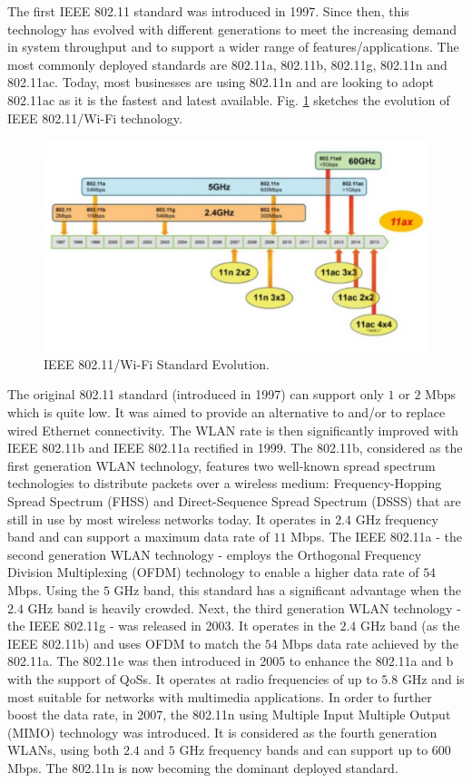 The first IEEE 802.11 standard was introduced in 1997. Since then, this technology has evolved with different generations to meet the increasing demand in system throughput and to support a wider range of features/applications. The most commonly deployed standards are 802.11a, 802.11b, 802.11g, 802.11n and 802.11ac. Today, most businesses are using 802.11n and are looking to adopt 802.11ac as it is the fastest and latest available. Fig. \ref{figs:Wi-Fi-evolution} sketches the evolution of IEEE 802.11/Wi-Fi technology.

\begin{figure}[!t]
	\centering
	\includegraphics[width=1.0\columnwidth]{figs/Wi-Fi-evolution.pdf}
	\caption{IEEE 802.11/Wi-Fi Standard Evolution.}
	\label{figs:Wi-Fi-evolution}
\end{figure}

The original 802.11 standard (introduced in 1997) can support only $1$ or $2$ Mbps which is quite low. It was aimed to provide an alternative to and/or to replace wired Ethernet connectivity. The WLAN rate is then significantly improved with IEEE 802.11b and IEEE 802.11a rectified in 1999. The 802.11b, considered as the first generation WLAN technology, features two well-known spread spectrum technologies to distribute packets over a wireless medium: Frequency-Hopping Spread Spectrum (FHSS) and Direct-Sequence Spread Spectrum (DSSS) that are still in use by most wireless networks today. It operates in $2.4$ GHz frequency band and can support a maximum data rate of $11$ Mbps. The IEEE 802.11a - the second generation WLAN technology - employs the Orthogonal Frequency Division Multiplexing (OFDM) technology to enable a higher data rate of $54$ Mbps. Using the $5$ GHz band, this standard has a significant advantage when the $2.4$ GHz band is heavily crowded. Next, the third generation WLAN technology - the IEEE 802.11g - was released in 2003. It operates in the $2.4$ GHz band (as the IEEE 802.11b) and uses OFDM to match the $54$ Mbps data rate achieved by the 802.11a. The 802.11e was then introduced in 2005 to enhance the 802.11a and b with the support of QoSs. It operates at radio frequencies of up to $5.8$ GHz and is most suitable for networks with multimedia applications. In order to further boost the data rate, in 2007, the 802.11n using Multiple Input Multiple Output (MIMO) technology was introduced. It is considered as the fourth generation WLANs, using both $2.4$ and $5$ GHz frequency bands and can support up to $600$ Mbps. The 802.11n is now becoming the dominant deployed standard.

